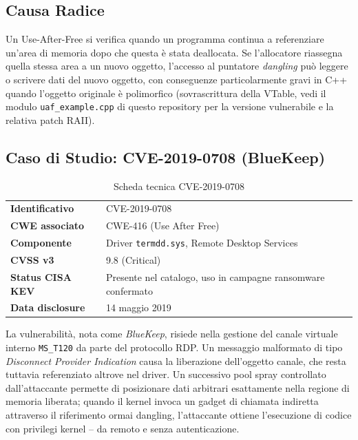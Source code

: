 \documentclass[11pt,a4paper]{article}
\begin{document}
\subsection{Causa Radice}

Un Use-After-Free si verifica quando un programma continua a referenziare un'area di memoria dopo che questa è stata deallocata. Se l'allocatore riassegna quella stessa area a un nuovo oggetto, l'accesso al puntatore \textit{dangling} può leggere o scrivere dati del nuovo oggetto, con conseguenze particolarmente gravi in C++ quando l'oggetto originale è polimorfico (sovrascrittura della VTable, vedi il modulo \texttt{uaf\_example.cpp} di questo repository per la versione vulnerabile e la relativa patch RAII).

\subsection{Caso di Studio: CVE-2019-0708 (BlueKeep)}

\begin{table}[h]
\centering
\begin{tabular}{@{}ll@{}}
\toprule
\textbf{Identificativo} & CVE-2019-0708 \\
\textbf{CWE associato} & CWE-416 (Use After Free) \\
\textbf{Componente} & Driver \texttt{termdd.sys}, Remote Desktop Services \\
\textbf{CVSS v3} & 9.8 (Critical) \\
\textbf{Status CISA KEV} & Presente nel catalogo, uso in campagne ransomware confermato \\
\textbf{Data disclosure} & 14 maggio 2019 \\
\bottomrule
\end{tabular}
\caption{Scheda tecnica CVE-2019-0708}
\end{table}

La vulnerabilità, nota come \textit{BlueKeep}, risiede nella gestione del canale virtuale interno \texttt{MS\_T120} da parte del protocollo RDP. Un messaggio malformato di tipo \textit{Disconnect Provider Indication} causa la liberazione dell'oggetto canale, che resta tuttavia referenziato altrove nel driver. Un successivo pool spray controllato dall'attaccante permette di posizionare dati arbitrari esattamente nella regione di memoria liberata; quando il kernel invoca un gadget di chiamata indiretta attraverso il riferimento ormai dangling, l'attaccante ottiene l'esecuzione di codice con privilegi kernel -- da remoto e senza autenticazione.
\end{document}
